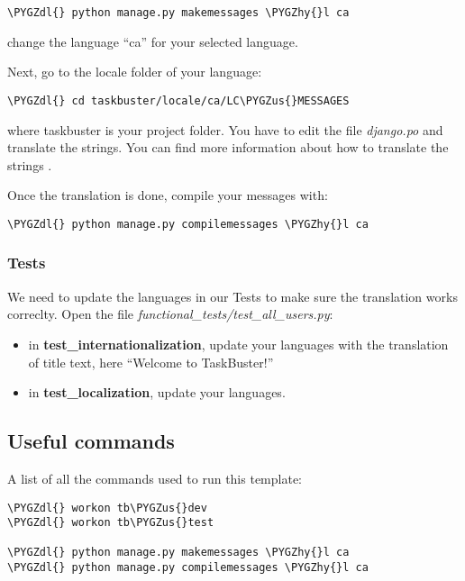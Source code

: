 \documentclass[letterpaper,10pt,english]{sphinxmanual}
\def\PYGZus{\char`\_}
\def\PYGZdl{\char`\$}
\def\PYGZhy{\char`\-}
\begin{document}
\begin{Verbatim}[commandchars=\\\{\}]
\PYGZdl{} python manage.py makemessages \PYGZhy{}l ca
\end{Verbatim}

change the language ``ca'' for your selected language.

Next, go to the locale folder of your language:

\begin{Verbatim}[commandchars=\\\{\}]
\PYGZdl{} cd taskbuster/locale/ca/LC\PYGZus{}MESSAGES
\end{Verbatim}

where taskbuster is your project folder. You have to edit the file \emph{django.po} and translate the strings. You can find more information about how to translate the strings .

Once the translation is done, compile your messages with:

\begin{Verbatim}[commandchars=\\\{\}]
\PYGZdl{} python manage.py compilemessages \PYGZhy{}l ca
\end{Verbatim}


\subsubsection{Tests}
\label{quick_start:tests}
We need to update the languages in our Tests to make sure the translation works correclty. Open the file \emph{functional\_tests/test\_all\_users.py}:
\begin{itemize}
\item {} 
in \textbf{test\_internationalization}, update your languages with the translation of title text, here ``Welcome to TaskBuster!''

\item {} 
in \textbf{test\_localization}, update your languages.

\end{itemize}


\subsection{Useful commands}
\label{quick_start:useful-commands}
A list of all the commands used to run this template:

\begin{Verbatim}[commandchars=\\\{\}]
\PYGZdl{} workon tb\PYGZus{}dev
\PYGZdl{} workon tb\PYGZus{}test

\PYGZdl{} python manage.py makemessages \PYGZhy{}l ca
\PYGZdl{} python manage.py compilemessages \PYGZhy{}l ca
\end{Verbatim}
\end{document}
